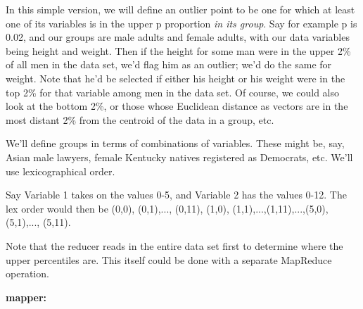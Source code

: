 In this simple version, we will define an outlier point to be one for
which at least one of its variables is in the upper p proportion {\it in
its group}. Say for example p is 0.02, and our groups are male adults
and female adults, with our data variables being height and weight. Then
if the height for some man were in the upper 2\% of all men in the data
set, we'd flag him as an outlier; we'd do the same for weight. Note that
he'd be selected if either his height or his weight were in the top 2\%
for that variable among men in the data set.  Of course, we could also
look at the bottom 2\%, or those whose Euclidean distance as vectors are
in the most distant 2\% from the centroid of the data in a group, etc.

We'll define groups in terms of combinations of variables.  These might
be, say, Asian male lawyers, female Kentucky natives registered as
Democrats, etc.  We'll use lexicographical order.

Say Variable 1 takes on the values 0-5, and Variable 2 has the values
0-12.  The lex order would then be (0,0), (0,1),..., (0,11), (1,0),
(1,1),...,(1,11),...,(5,0), (5,1),..., (5,11).

Note that the reducer reads in the entire data set first to determine
where the upper percentiles are.  This itself could be done with a
separate MapReduce operation.

{\bf mapper:}

